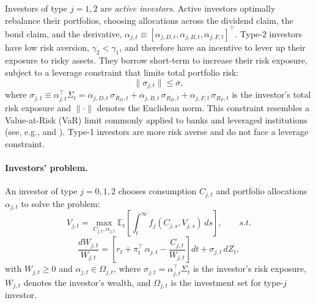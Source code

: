 \documentclass[12pt,english]{article}
\begin{document}
Investors of type $j = 1,2$ are \textit{active investors}.
Active investors optimally rebalance their portfolios, choosing allocations across the dividend claim, the bond claim, and the derivative, $\alpha_{j,t} \equiv [\alpha_{j,D,t}, \alpha_{j,B,t}, \alpha_{j,F,t}]^\top$.
Type-2 investors have low risk aversion, $\gamma_2 < \gamma_1$, and therefore have an incentive to lever up their exposure to risky assets.
They borrow short-term to increase their risk exposure, subject to a leverage constraint that limits total portfolio risk:
\begin{equation}\label{eq:leverage_constraint}
    \|\sigma_{j,t}\| \leq \overline{\sigma},
\end{equation}
where $\sigma_{j,t} \equiv \alpha_{j,t}^\top \Sigma_t =  \alpha_{j,D,t}\,\sigma_{R_D,t} + \alpha_{j,B,t}\,\sigma_{R_B,t} + \alpha_{j,F,t}\,\sigma_{R_F,t}$ is the investor's total risk exposure and $\|\cdot\|$ denotes the Euclidean norm.
This constraint resembles a Value-at-Risk (VaR) limit commonly applied to banks and leveraged institutions (see, e.g., \citealt{adrian2014procyclical} and \citealt{brunnermeier2009market}).
Type-1 investors are more risk averse and do not face a leverage constraint.

\paragraph{Investors' problem.}

An investor of type $j = 0,1,2$ chooses consumption $C_{j,t}$ and portfolio allocations $\alpha_{j,t}$ to solve the problem:
\begin{equation}\label{eq:inv-problem}
    V_{j,t} = \max_{C_{j,t},\alpha_{j,t}} 
    \mathbb{E}_t \left[ \int_t^\infty f_j(C_{j,s},V_{j,s})\, ds \right], \qquad s.t.
\end{equation}
\begin{equation}\label{eq:budget_constraint}
    \frac{d W_{j,t}}{W_{j,t}} = \left[r_t + \pi_{t}^\top \,\alpha_{j,t} - \frac{C_{j,t}}{W_{j,t}}\right] dt 
    + \sigma_{j,t}\, dZ_t,
\end{equation}
with $W_{j,t} \geq 0$ and $\alpha_{j,t} \in \Omega_{j,t}$,
where $\sigma_{j,t} = \alpha_{j,t}^ \top \Sigma_{t}$ is the investor's risk exposure,
$W_{j,t}$ denotes the investor's wealth, and $\Omega_{j,t}$ is the investment set for type-$j$ investor.
\end{document}
